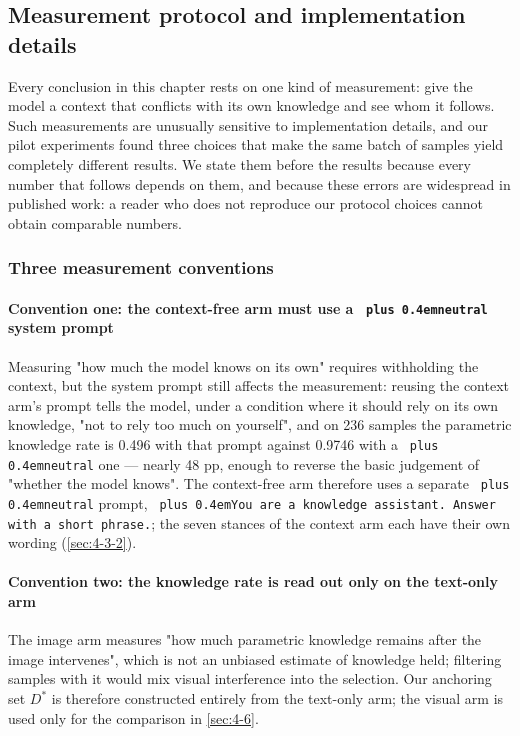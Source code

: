 \documentclass[pdflatex,sn-basic,Numbered]{sn-jnl}
\theoremstyle{thmstyleone}
\theoremstyle{thmstyletwo}
\theoremstyle{thmstylethree}
\DeclareRobustCommand{\code}[1]{\texttt{\spaceskip=0pt plus 0.4em\relax#1}}
\begin{document}
\subsection{Measurement protocol and implementation details}
\label{sec:4-3}

Every conclusion in this chapter rests on one kind of measurement: give the model a context
that conflicts with its own knowledge and see whom it follows. Such measurements are unusually
sensitive to implementation details, and our pilot experiments found three choices that make
the same batch of samples yield completely different results. We state them before the results
because every number that follows depends on them, and because these errors are widespread in
published work: a reader who does not reproduce our protocol choices cannot obtain comparable
numbers.

\subsubsection{Three measurement conventions}
\label{sec:4-3-1}

\paragraph{Convention one: the context-free arm must use a \code{neutral} system prompt}
\label{sec:x711a8e88a1}

Measuring "how much the model knows on its own" requires withholding the context, but the
system prompt still affects the measurement: reusing the context arm's prompt tells the model,
under a condition where it should rely on its own knowledge, "not to rely too much on yourself",
and on 236 samples the parametric knowledge rate is 0.496 with that prompt against 0.9746 with a
\code{neutral} one — nearly 48 pp, enough to reverse the basic judgement of "whether the model knows".
The context-free arm therefore uses a separate \code{neutral} prompt,
\code{You are a knowledge assistant. Answer with a short phrase.}; the seven stances of the context
arm each have their own wording (\ref{sec:4-3-2}).

\paragraph{Convention two: the knowledge rate is read out only on the text-only arm}
\label{sec:x0325895279}

The image arm measures "how much parametric knowledge remains after the image intervenes",
which is not an unbiased estimate of knowledge held; filtering samples with it would mix visual
interference into the selection. Our anchoring set $D^*$ is therefore constructed entirely from
the text-only arm; the visual arm is used only for the comparison in \ref{sec:4-6}.
\end{document}
